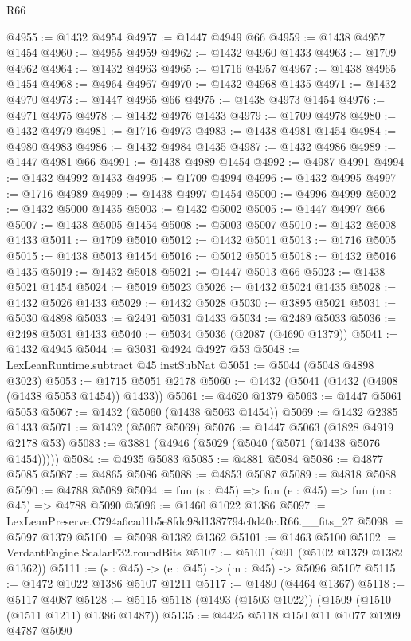 \begin{lexlean}{R66}
\begin{coremodule}
@4955 := @1432 @4954
@4957 := @1447 @4949 @66
@4959 := @1438 @4957 @1454
@4960 := @4955 @4959
@4962 := @1432 @4960 @1433
@4963 := @1709 @4962
@4964 := @1432 @4963
@4965 := @1716 @4957
@4967 := @1438 @4965 @1454
@4968 := @4964 @4967
@4970 := @1432 @4968 @1435
@4971 := @1432 @4970
@4973 := @1447 @4965 @66
@4975 := @1438 @4973 @1454
@4976 := @4971 @4975
@4978 := @1432 @4976 @1433
@4979 := @1709 @4978
@4980 := @1432 @4979
@4981 := @1716 @4973
@4983 := @1438 @4981 @1454
@4984 := @4980 @4983
@4986 := @1432 @4984 @1435
@4987 := @1432 @4986
@4989 := @1447 @4981 @66
@4991 := @1438 @4989 @1454
@4992 := @4987 @4991
@4994 := @1432 @4992 @1433
@4995 := @1709 @4994
@4996 := @1432 @4995
@4997 := @1716 @4989
@4999 := @1438 @4997 @1454
@5000 := @4996 @4999
@5002 := @1432 @5000 @1435
@5003 := @1432 @5002
@5005 := @1447 @4997 @66
@5007 := @1438 @5005 @1454
@5008 := @5003 @5007
@5010 := @1432 @5008 @1433
@5011 := @1709 @5010
@5012 := @1432 @5011
@5013 := @1716 @5005
@5015 := @1438 @5013 @1454
@5016 := @5012 @5015
@5018 := @1432 @5016 @1435
@5019 := @1432 @5018
@5021 := @1447 @5013 @66
@5023 := @1438 @5021 @1454
@5024 := @5019 @5023
@5026 := @1432 @5024 @1435
@5028 := @1432 @5026 @1433
@5029 := @1432 @5028
@5030 := @3895 @5021
@5031 := @5030 @4898
@5033 := @2491 @5031 @1433
@5034 := @2489 @5033
@5036 := @2498 @5031 @1433
@5040 := @5034 @5036 (@2087 (@4690 @1379))
@5041 := @1432 @4945
@5044 := @3031 @4924 @4927 @53
@5048 := LexLeanRuntime.subtract @45 instSubNat
@5051 := @5044 (@5048 @4898 @3023)
@5053 := @1715 @5051 @2178
@5060 := @1432 (@5041 (@1432 (@4908 (@1438 @5053 @1454)) @1433))
@5061 := @4620 @1379
@5063 := @1447 @5061 @5053
@5067 := @1432 (@5060 (@1438 @5063 @1454))
@5069 := @1432 @2385 @1433
@5071 := @1432 (@5067 @5069)
@5076 := @1447 @5063 (@1828 @4919 @2178 @53)
@5083 := @3881 (@4946 (@5029 (@5040 (@5071 (@1438 @5076 @1454)))))
@5084 := @4935 @5083
@5085 := @4881 @5084
@5086 := @4877 @5085
@5087 := @4865 @5086
@5088 := @4853 @5087
@5089 := @4818 @5088
@5090 := @4788 @5089
@5094 := fun (s : @45) => fun (e : @45) => fun (m : @45) => @4788 @5090
@5096 := @1460 @1022 @1386
@5097 := LexLeanPreserve.C794a6cad1b5e8fdc98d1387794c0d40c.R66.__fits_27
@5098 := @5097 @1379
@5100 := @5098 @1382 @1362
@5101 := @1463 @5100
@5102 := VerdantEngine.ScalarF32.roundBits
@5107 := @5101 (@91 (@5102 @1379 @1382 @1362))
@5111 := (s : @45) -> (e : @45) -> (m : @45) -> @5096 @5107
@5115 := @1472 @1022 @1386 @5107 @1211
@5117 := @1480 (@4464 @1367)
@5118 := @5117 @4087
@5128 := @5115 @5118 (@1493 (@1503 @1022)) (@1509 (@1510 (@1511 @1211) @1386 @1487))
@5135 := @4425 @5118 @150 @11 @1077 @1209 @4787 @5090

\end{coremodule}
\end{lexlean}
